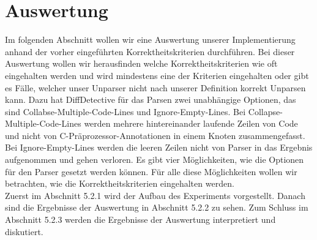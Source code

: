\section{Auswertung}

Im folgenden Abschnitt wollen wir eine Auswertung unserer Implementierung anhand der vorher eingeführten Korrektheitskriterien durchführen. Bei dieser Auswertung wollen wir herausfinden welche Korrektheitskriterien wie oft eingehalten werden und wird mindestens eine der Kriterien eingehalten oder gibt es Fälle, welcher unser Unparser nicht nach unserer Definition korrekt Unparsen kann. Dazu hat DiffDetective für das Parsen zwei unabhängige Optionen, das sind Collabse-Multiple-Code-Lines und Ignore-Empty-Lines. Bei Collapse-Multiple-Code-Lines werden mehrere hintereinander laufende Zeilen von Code und nicht von C-Präprozessor-Annotationen in einem Knoten zusammengefasst. Bei Ignore-Empty-Lines werden die leeren Zeilen nicht von Parser in das Ergebnis aufgenommen und gehen verloren. Es gibt vier Möglichkeiten, wie die Optionen für den Parser gesetzt werden können. Für alle diese Möglichkeiten wollen wir betrachten, wie die Korrektheitskriterien eingehalten werden.\\

Zuerst im Abschnitt 5.2.1 wird der Aufbau des Experiments vorgestellt. Danach sind die Ergebnisse der Auswertung in Abschnitt 5.2.2 zu sehen. Zum Schluss im Abschnitt 5.2.3 werden die Ergebnisse der Auswertung interpretiert und diskutiert.


